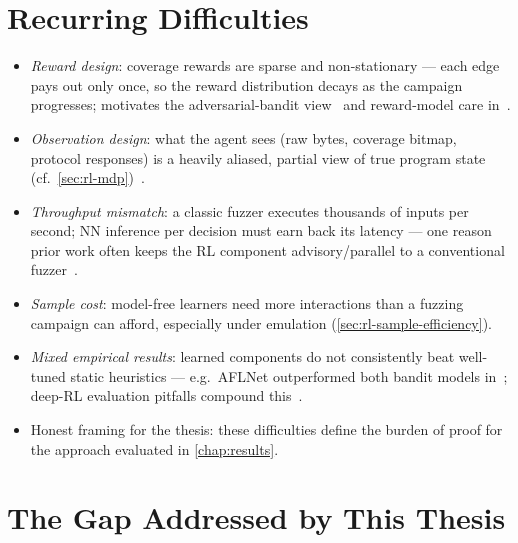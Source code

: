 \section{Recurring Difficulties}\label{sec:rlfuzz-difficulties}

\begin{itemize}
  \item \emph{Reward design}: coverage rewards are sparse and non-stationary --- each edge pays
    out only once, so the reward distribution decays as the campaign progresses; motivates the
    adversarial-bandit view~\cite{borcherding_bandits_2023} and reward-model care
    in~\cite{wang_syzvegas_2021}.
  \item \emph{Observation design}: what the agent sees (raw bytes, coverage bitmap, protocol
    responses) is a heavily aliased, partial view of true program state
    (cf.\ \cref{sec:rl-mdp})~\cite{bottinger_deep_2018}.
  \item \emph{Throughput mismatch}: a classic fuzzer executes thousands of inputs per second;
    NN inference per decision must earn back its latency --- one reason prior work often keeps the
    RL component advisory/parallel to a conventional fuzzer~\cite{binosi_rainfuzz_2023}.
  \item \emph{Sample cost}: model-free learners need more interactions than a fuzzing campaign
    can afford, especially under emulation (\cref{sec:rl-sample-efficiency}).
  \item \emph{Mixed empirical results}: learned components do not consistently beat well-tuned
    static heuristics --- e.g.\ AFLNet outperformed both bandit models
    in~\cite{borcherding_bandits_2023}; deep-RL evaluation pitfalls compound
    this~\cite{henderson_deep_2019}.
  \item Honest framing for the thesis: these difficulties define the burden of proof for the
    approach evaluated in \cref{chap:results}.
\end{itemize}

\section{The Gap Addressed by This Thesis}\label{sec:rlfuzz-gap}

